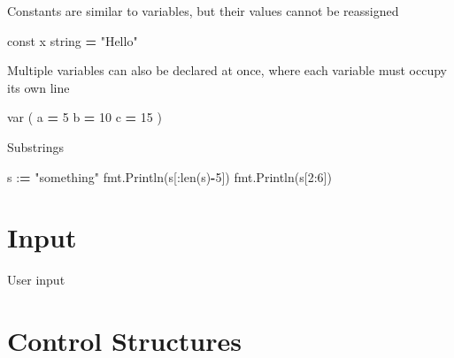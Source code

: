 \documentclass[]{book}
\newenvironment{Shaded}{\begin{snugshade}}{\end{snugshade}}
\newcommand{\BuiltInTok}[1]{#1}
\newcommand{\DecValTok}[1]{\textcolor[rgb]{0.00,0.00,0.81}{#1}}
\newcommand{\NormalTok}[1]{#1}
\newcommand{\OperatorTok}[1]{\textcolor[rgb]{0.81,0.36,0.00}{\textbf{#1}}}
\newcommand{\SpecialCharTok}[1]{\textcolor[rgb]{0.00,0.00,0.00}{#1}}
\newcommand{\StringTok}[1]{\textcolor[rgb]{0.31,0.60,0.02}{#1}}
\begin{document}
Constants are similar to variables, but their values cannot be reassigned

\begin{Shaded}
\begin{Highlighting}[]
\NormalTok{const x string }\OperatorTok{=} \StringTok{"Hello"}
\end{Highlighting}
\end{Shaded}

Multiple variables can also be declared at once, where each variable must occupy its own line

\begin{Shaded}
\begin{Highlighting}[]
\NormalTok{var (}
\NormalTok{    a }\OperatorTok{=} \DecValTok{5}
\NormalTok{    b }\OperatorTok{=} \DecValTok{10}
\NormalTok{    c }\OperatorTok{=} \DecValTok{15}
\NormalTok{)}
\end{Highlighting}
\end{Shaded}

Substrings

\begin{Shaded}
\begin{Highlighting}[]
\NormalTok{s :}\OperatorTok{=} \StringTok{"something"}
\NormalTok{fmt.Println(s[:}\BuiltInTok{len}\NormalTok{(s)}\OperatorTok{-}\DecValTok{5}\NormalTok{])}
\NormalTok{fmt.Println(s[}\DecValTok{2}\NormalTok{:}\DecValTok{6}\NormalTok{])}
\end{Highlighting}
\end{Shaded}

\hypertarget{input}{%
\section{Input}\label{input}}

User input

\begin{Shaded}
\end{Shaded}

\hypertarget{control-structures}{%
\section{Control Structures}\label{control-structures}}
\end{document}
